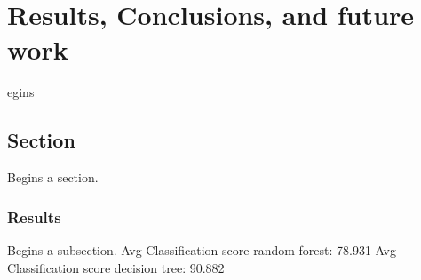 %
%
\let\textcircled=\pgftextcircled
\chapter{Results, Conclusions, and future work}
\label{chap:intro}

egins

\section{Section}
\label{sec:sec01}

Begins a section.

\subsection{Results}
\label{subsec:subsec01}

Begins a subsection.
Avg Classification score random forest: 78.931%
Avg Classification score decision tree: 90.882%



